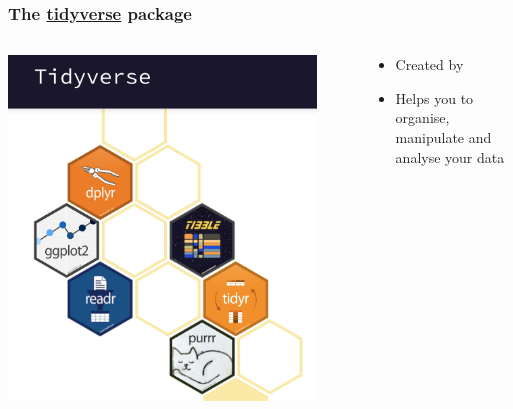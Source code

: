 \documentclass{beamer}
\begin{document}
\begin{frame}
\frametitle{The \href{https://www.tidyverse.org}{tidyverse} package}
\begin{columns}
\begin{center}
\includegraphics[width=0.9\textwidth]{tidy.jpg}
\end{center}
\begin{center}
\begin{itemize}
\item Created by {}
\item Helps you to organise, manipulate and analyse your data
\end{itemize}
\end{center}
\end{columns}
\end{frame}
\end{document}
